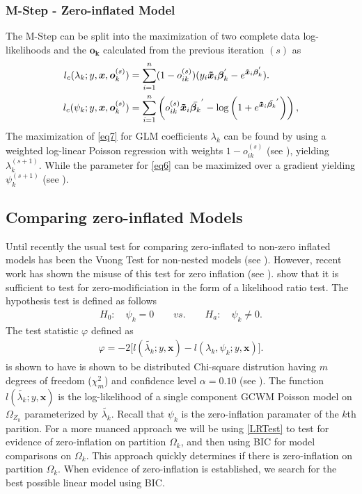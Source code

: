 \documentclass[11pt,letterpaper]{article}
\numberwithin{equation}{section}
\numberwithin{equation}{section}
\numberwithin{equation}{section}
\begin{document}
\subsubsection{M-Step - Zero-inflated Model} 
The M-Step can be split into the maximization of two complete data log-likelihoods and the $\bm{o_k}$ calculated from the previous iteration $(s)$ as
\begin{align}
 l_c(\lambda_k; y,\bm{x},\bm{o}_k^{(s)}) &= \sum_{i=1}^n (1- o_{ik}^{(s)}) (y_i \bm{\tilde{x}}_i \bm{\beta}_k^{'}  - e^{\bm{\tilde{x}}_i \bm{\beta}_k^{'}})\label{eq7}.\\
l_c(\psi_k;y,\bm{x},\bm{o}_k^{(s)}) &=\sum_{i=1}^n \left( o_{ik}^{(s)} \bm{\tilde{x}}_i \bar{\bm{\beta}_k }^{'} - \log \left(1+ e^{ \bm{\tilde{x}}_i \bar{\bm{\beta}_k }^{'}} \right) \right), \label{eq6}   
 \end{align}
The maximization of \eqref{eq7} for GLM coefficients $\lambda_k$ can be found by using a weighted log-linear Poisson regression with weights $1 - o_{ik}^{(s)}$ (see \cite{McCullaghNelder1989}), yielding $\lambda_k^{(s+1)}$.
While the parameter for \eqref{eq6} can be maximized over a gradient yielding $\psi_k^{(s+1)}$ (see \cite{Lambert}).

\subsection{Comparing zero-inflated Models}

Until recently the usual test for comparing zero-inflated to non-zero inflated models has been the Vuong Test for non-nested models (see \cite{vuongTest}). However, recent work has shown the misuse of this test for zero inflation (see \cite{misuse}). \cite{newIntuitive} show that it is sufficient to test for zero-modificiation in the form of a likelihood ratio test. The hypothesis test is defined as follows
\begin{align*}
& & H_0: \quad \psi_k = 0 \quad\quad vs. \quad\quad H_a: \quad \psi_k \neq 0 . & &
\end{align*}
The test statistic $\varphi$ defined as 
\begin{align}
\varphi = -2 \bigg[l(\tilde{\lambda_k}; y, \bm{x}) - l(\lambda_k, \psi_k; y , \bm{x} )\bigg].
\label{LRTest}
\end{align}
is shown to have is shown to be distributed Chi-square distrution having $m$ degrees of freedom ($\chi^2_m $) and confidence level $\alpha = 0.10$ (see \cite{newIntuitive}). The function 
$l(\tilde{\lambda_k}; y , \bm{x})$ is the log-likelihood of a single component GCWM Poisson model on $\Omega_{Z_k}$ parameterized by $\tilde{\lambda_k}$. Recall that $\psi_k$ is the zero-inflation paramater of the $k$th parition. For a more nuanced approach we will be using \eqref{LRTest} to  test for evidence of zero-inflation on partition $\Omega_k$, and then using BIC for model comparisons on $\Omega_k$. This approach quickly determines if there is zero-inflation on partition $\Omega_k$.  When evidence of zero-inflation is established, we search for the best possible linear model using BIC. 
\end{document}
